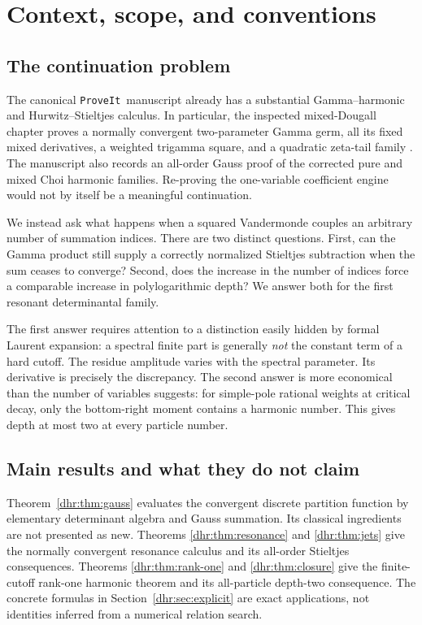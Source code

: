 \documentclass[11pt,letterpaper]{article}
\numberwithin{equation}{section}
\theoremstyle{definition}\newtheorem{definition}[theorem]{Definition}
\theoremstyle{remark}\newtheorem{remark}[theorem]{Remark}
\newcommand{\repo}{\texttt{ProveIt}}
\begin{document}
\section{Context, scope, and conventions}
\label{dhr:sec:context}

\subsection{The continuation problem}
The canonical \repo\ manuscript already has a substantial Gamma--harmonic
and Hurwitz--Stieltjes calculus. In particular, the inspected mixed-Dougall
chapter proves a normally convergent two-parameter Gamma germ, all its
fixed mixed derivatives, a weighted trigamma square, and a quadratic
zeta-tail family \cite{repo:readme,repo:dougall}. The manuscript also records
an all-order Gauss proof of the corrected pure and mixed Choi harmonic
families. Re-proving the one-variable coefficient engine would not by
itself be a meaningful continuation.

We instead ask what happens when a squared Vandermonde couples an arbitrary
number of summation indices. There are two distinct questions. First,
can the Gamma product still supply a correctly normalized Stieltjes
subtraction when the sum ceases to converge? Second, does the increase
in the number of indices force a comparable increase in polylogarithmic
depth? We answer both for the first resonant determinantal family.

The first answer requires attention to a distinction easily hidden by
formal Laurent expansion: a spectral finite part is generally \emph{not}
the constant term of a hard cutoff. The residue amplitude varies with
the spectral parameter. Its derivative is precisely the discrepancy.
The second answer is more economical than the number of variables
suggests: for simple-pole rational weights at critical decay, only the
bottom-right moment contains a harmonic number. This gives depth at most
two at every particle number.

\subsection{Main results and what they do not claim}
Theorem~\ref{dhr:thm:gauss} evaluates the convergent discrete partition
function by elementary determinant algebra and Gauss summation. Its
classical ingredients are not presented as new. Theorems
\ref{dhr:thm:resonance} and \ref{dhr:thm:jets} give the normally convergent
resonance calculus and its all-order Stieltjes consequences. Theorems
\ref{dhr:thm:rank-one} and \ref{dhr:thm:closure} give the finite-cutoff
rank-one harmonic theorem and its all-particle depth-two consequence.
The concrete formulas in Section~\ref{dhr:sec:explicit} are exact
applications, not identities inferred from a numerical relation search.
\end{document}

